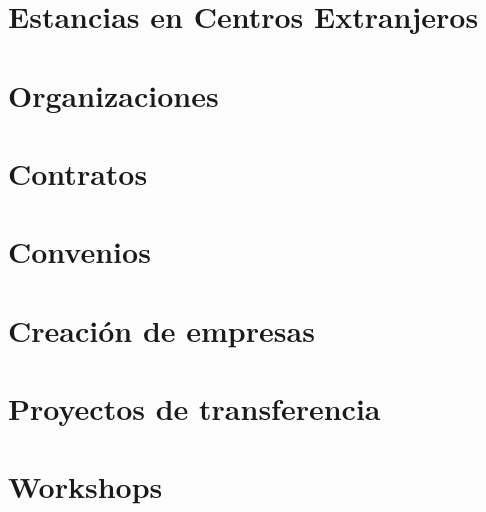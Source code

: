 \documentclass[9pt]{article}
\begin{document}
\begin{comment}
\section*{Patentes y Modelos de Utilidad}

\end{comment}

\section*{Estancias en Centros Extranjeros}


\begin{comment}
\section*{Tesis Doctorales Dirigidas}

\addcontentsline{toc}{chapter}{Tesis Doctorales Dirigidas}
\end{comment}

\renewcommand{\refname}{Experiencia Docente Universitaria}


\renewcommand{\refname}{Proyectos Fin de Carrera Dirigidos}


\renewcommand{\refname}{Cursos Impartidos}


\renewcommand{\refname}{}

\section*{Organizaciones}
\label{sec:organizations}
\vspace{-5ex}


\section*{Contratos}
\label{sec:contratos}
\vspace{-5ex}


\section*{Convenios}
\label{sec:convenios}
\vspace{-5ex}


\section*{Creación de empresas}
\label{sec:empresas}
\vspace{-5ex}


\section*{Proyectos de transferencia}
\label{sec:proyectos}
\vspace{-5ex}


\section*{Workshops}
\label{sec:workshops}
\vspace{-5ex}


\label{end}
\end{document}
